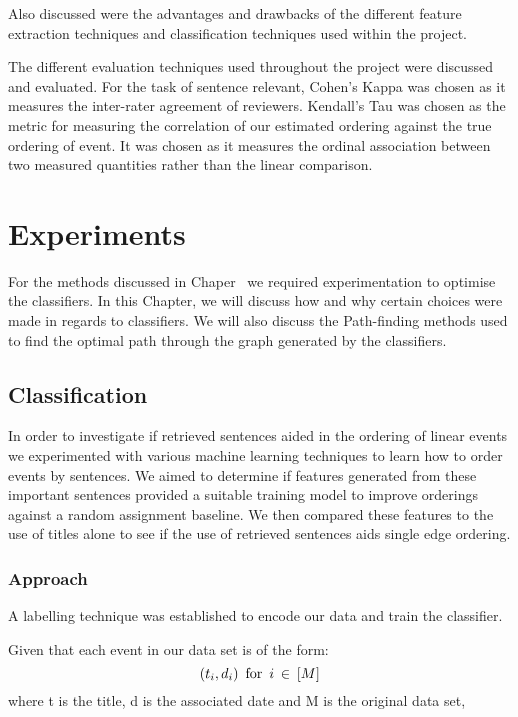 \documentclass[bsc,frontabs,twoside,singlespacing,parskip,deptreport]{infthesis}     %
\begin{document}
Also discussed were the advantages and drawbacks of the different feature extraction techniques and classification
techniques used within the project.

The different evaluation techniques used throughout the project were discussed and evaluated. 
For the task of sentence relevant, Cohen's Kappa \cite{wood2007understanding} was chosen as it measures the inter-rater agreement of
reviewers. Kendall's Tau \cite{abdi2007kendall} was chosen as the metric for measuring the correlation of our estimated ordering
against the true ordering of event. It was chosen as it measures the ordinal association between two
measured quantities rather than the linear comparison.


\chapter{Experiments}
For the methods discussed in Chaper~\cite{chapter:methodology} we required experimentation to optimise the classifiers.
In this Chapter, we will discuss how and why certain choices were made in regards to classifiers.
We will also discuss the Path-finding methods used to find the optimal path through the graph generated by the
classifiers.

\section{Classification}
In order to investigate if retrieved sentences aided in the  ordering of linear events we experimented with various
machine learning techniques to learn how to order events by sentences.
We aimed to determine if features generated from these important sentences provided a suitable training model
to improve orderings against a random assignment baseline. We then compared these features to the use of titles alone
to see if the use of retrieved sentences aids single edge ordering.


\subsection{Approach}\label{sec:approach}
A labelling technique was established to encode our data and train the classifier.

Given that each event in our data set is of the form:
\begin{equation}
  (t_{i},d_{i}) \hspace{0.5em} \text{for} \hspace{0.5em} i \hspace{0.2em}\in \hspace{0.2em} [M]\nonumber
    \end{equation}
    where t is the title, d is the associated date and M is the original data set,
\end{document}
